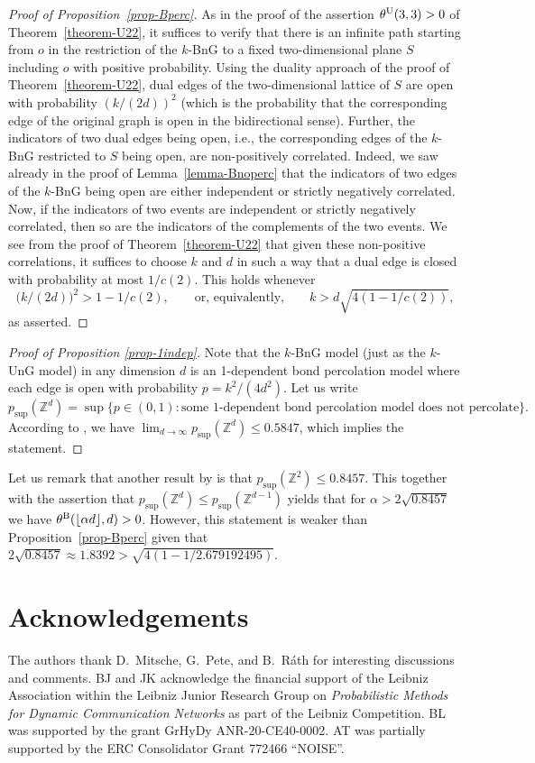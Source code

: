 \documentclass[a4paper, oneside, 11pt]{amsart}
\theoremstyle{definition}
\newcommand{\1}{\mathbbm{1}}
\newcommand{\0}{\mathbf{o}}
\newcommand{\Z}{\mathbb{Z}}
\newcommand*{\be}{\begin{equation}}
\newcommand*{\ee}{\end{equation}}
\numberwithin{equation}{section}
\begin{document}
\begin{proof}[Proof of Proposition~\ref{prop-Bperc}]
As in the proof of the assertion $\theta^{\rm U}(3,3)>0$ of Theorem~\ref{theorem-U22}, it suffices to verify that there is an infinite path starting from $o$ in the restriction of the $k$-BnG to a fixed two-dimensional plane $S$ including $o$ with positive probability. Using the duality approach of the proof of Theorem~\ref{theorem-U22}, dual edges of the two-dimensional lattice of $S$ are open with probability  $(k/(2d))^2$ (which is the probability that the corresponding edge of the original graph is open in the bidirectional sense).
Further, the indicators of two dual edges being open, i.e., the corresponding edges of the $k$-BnG restricted to $S$ being open, are non-positively correlated. Indeed, we saw already in the proof of Lemma~\ref{lemma-Bnoperc} that the indicators of two edges of the $k$-BnG being open are either independent or strictly negatively correlated. Now, if the indicators of two events are independent or strictly negatively correlated, then so are the indicators of the complements of the two events. We see from the proof of Theorem~\ref{theorem-U22} that given these non-positive correlations, it suffices to choose $k$ and $d$ in such a way that a dual edge is closed with probability at most $1/c(2)$. This holds whenever 
\be  
\big(k/(2d)\big)^2 > 1-1/c(2),\qquad \text{or, equivalently,}\qquad k>d\sqrt{4(1-1/c(2))}, 
\ee
as asserted. 
\end{proof}

\begin{proof}[Proof of Proposition \ref{prop-1indep}]
Note that the $k$-BnG model (just as the $k$-UnG model) in any dimension $d$ is an 1-dependent  bond percolation model where each edge is open with probability $p=k^2/(4d^2)$. Let us write 
\[ p_{\sup}(\Z^d)= \sup \{ p \in (0,1) \colon \text{some 1-dependent bond percolation model does not percolate} \}. \]
According to \cite{improvedLB}, we have 
 $\lim_{d\to\infty} p_{\sup}(\Z^d) \leq 0.5847$, which implies the statement.
\end{proof}

Let us remark that another result by \cite{improvedLB} is that $p_{\sup}(\Z^2) \leq 0.8457$. This together with the assertion that $p_{\sup}(\Z^d) \leq p_{\sup}(\Z^{d-1})$ yields that for $\alpha>2\sqrt{0.8457}$ we have $\theta^{\rm B}(\lfloor \alpha d \rfloor, d)>0$. However, this statement is weaker than Proposition~\ref{prop-Bperc} given that $2\sqrt{0.8457} \approx 1.8392 > \sqrt{4(1-1/2.679192495)}$. 

\section*{Acknowledgements}
The authors thank D.~Mitsche, G.~Pete, and B.~Ráth for interesting discussions and comments. BJ and JK acknowledge the financial support of the Leibniz Association within the Leibniz Junior Research Group on \textit{Probabilistic Methods for Dynamic Communication Networks} as part of the Leibniz Competition. BL was supported by the grant GrHyDy ANR-20-CE40-0002. AT  was partially supported by the ERC Consolidator Grant 772466 ``NOISE''.



\end{document}
